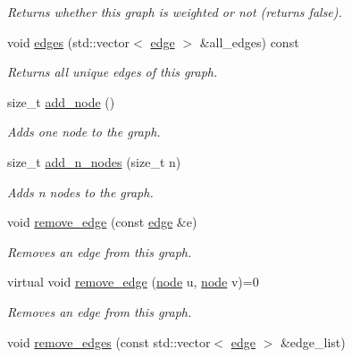\begin{DoxyCompactItemize}
\begin{DoxyCompactList}\small\item\em Returns whether this graph is weighted or not (returns false). \end{DoxyCompactList}\item 
void \hyperlink{classlgraph_1_1uxgraph_af6a643eaca31fa945b428567ab0fa66d}{edges} (std\-::vector$<$ \hyperlink{namespacelgraph_a76bd7d50719f03de7a85db259d80d572}{edge} $>$ \&all\-\_\-edges) const 
\begin{DoxyCompactList}\small\item\em Returns all unique edges of this graph. \end{DoxyCompactList}\item 
size\-\_\-t \hyperlink{classlgraph_1_1xxgraph_a6cb21d5e52afbb438a3e6643998c40cf}{add\-\_\-node} ()
\begin{DoxyCompactList}\small\item\em Adds one node to the graph. \end{DoxyCompactList}\item 
size\-\_\-t \hyperlink{classlgraph_1_1xxgraph_a8dd24aa48d55dfceaa87e47c32ae914a}{add\-\_\-n\-\_\-nodes} (size\-\_\-t n)
\begin{DoxyCompactList}\small\item\em Adds {\itshape n} nodes to the graph. \end{DoxyCompactList}\item 
void \hyperlink{classlgraph_1_1xxgraph_a46a75fa2a10a8674ab930e9dc766e2f9}{remove\-\_\-edge} (const \hyperlink{namespacelgraph_a76bd7d50719f03de7a85db259d80d572}{edge} \&e)
\begin{DoxyCompactList}\small\item\em Removes an edge from this graph. \end{DoxyCompactList}\item 
virtual void \hyperlink{classlgraph_1_1xxgraph_a7fd3a1309cde4f408c8d9d4cb3b898a8}{remove\-\_\-edge} (\hyperlink{namespacelgraph_a397169dd66adf725210a30fb7251773e}{node} u, \hyperlink{namespacelgraph_a397169dd66adf725210a30fb7251773e}{node} v)=0
\begin{DoxyCompactList}\small\item\em Removes an edge from this graph. \end{DoxyCompactList}\item 
void \hyperlink{classlgraph_1_1xxgraph_aef7c4bf62f3f4db362b2d3accb3b6d3d}{remove\-\_\-edges} (const std\-::vector$<$ \hyperlink{namespacelgraph_a76bd7d50719f03de7a85db259d80d572}{edge} $>$ \&edge\-\_\-list)

\end{DoxyCompactItemize}

